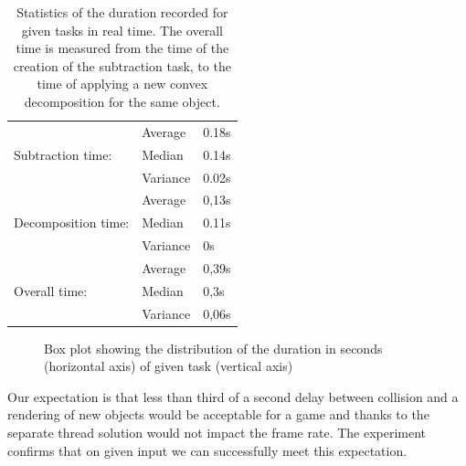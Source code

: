 \begin{table}
	\centering
  \begin{tabular}{lll}
  & Average & 0.18s \\
  Subtraction time: & Median & 0.14s \\
  & Variance & 0.02s \\
  \hline
  & Average & 0,13s \\
  Decomposition time: & Median & 0.11s \\
  & Variance & 0s \\
  \hline
  & Average & 0,39s \\
  Overall time:& Median & 0,3s \\
  & Variance & 0,06s \\
  \end{tabular}
  \caption{Statistics of the duration recorded for given tasks in real time. The overall time is measured from the time of the creation of the subtraction task, to the time of applying a new convex decomposition for the same object.}
  \label{tab:performace}
\end{table}

\begin{figure}
\centering
{}
\caption{Box plot showing the distribution of the duration in seconds (horizontal axis) of given task (vertical axis)}
\label{fig:boxtimes}
\end{figure}



Our expectation is that less than third of a second delay between collision and a rendering of new objects would be acceptable for a game and thanks to the separate thread solution would not impact the frame rate. The experiment confirms that on given input we can successfully meet this expectation.

